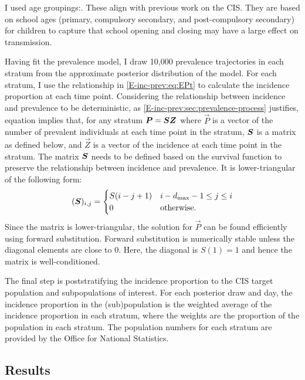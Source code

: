 \documentclass[thesis.tex]{subfiles}
\begin{document}
I used age groupings:.
These align with previous work on the CIS.
They are based on school ages (primary, compulsory secondary, and post-compulsory secondary) for children to capture that school opening and closing may have a large effect on transmission.

Having fit the prevalence model, I draw 10,000 prevalence trajectories in each stratum from the approximate posterior distribution of the model.
For each stratum, I use the relationship in \cref{E-inc-prev:eq:EPt} to calculate the incidence proportion at each time point.
Considering the relationship between incidence and prevalence to be deterministic, as \cref{E-inc-prev:sec:prevalence-process} justifies, equation implies that, for any stratum $\bm{P} = \bm{S} \bm{Z}$ where $\vec{P}$ is a vector of the number of prevalent individuals at each time point in the stratum, $\bm{S}$ is a matrix as defined below, and $\vec{Z}$ is a vector of the incidence at each time point in the stratum.
The matrix $\bm{S}$ needs to be defined based on the survival function to preserve the relationship between incidence and prevalence.
It is lower-triangular of the following form:
\begin{align}
    (\bm{S})_{i,j} = \begin{cases}
        S(i - j + 1) & i - d_\text{max} - 1 \leq j \leq i \\
        0 & \text{otherwise.}
    \end{cases}
\end{align}
Since the matrix is lower-triangular, the solution for $\vec{P}$ can be found efficiently using forward substitution.
Forward substitution is numerically stable unless the diagonal elements are close to 0.
Here, the diagonal is $S(1) = 1$ and hence the matrix is well-conditioned.

The final step is poststratifying the incidence proportion to the CIS target population and subpopulations of interest.
For each posterior draw and day, the incidence proportion in the (sub)population is the weighted average of the incidence proportion in each stratum, where the weights are the proportion of the population in each stratum.
The population numbers for each stratum are provided by the Office for National Statistics.

\subsection{Results} \label{backcalc:sec:results}
\end{document}
